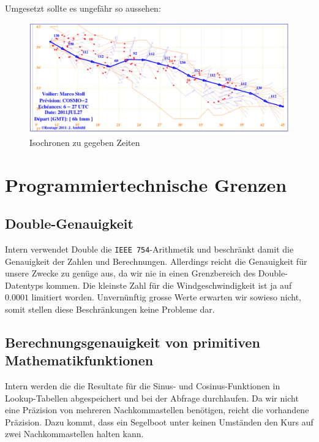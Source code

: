 Umgesetzt sollte es ungefähr so aussehen:

\begin{figure}[h!]
\centering
\includegraphics[width=1\linewidth]{img/isochronen}
\caption{Isochronen zu gegeben Zeiten}
\label{isochron}
\end{figure}

\section{Programmiertechnische Grenzen}
\subsection{Double-Genauigkeit}
Intern verwendet Double die \texttt{IEEE 754}-Arithmetik und beschränkt damit
die Genauigkeit der Zahlen und Berechnungen. Allerdings reicht die Genauigkeit
für unsere Zwecke zu genüge aus, da wir nie in einen Grenzbereich des
Double-Datentyps kommen. Die kleinste Zahl für die Windgeschwindigkeit ist ja
auf $0.0001$ limitiert worden. Unvernünftig grosse Werte erwarten wir sowieso
nicht, somit stellen diese Beschränkungen keine Probleme dar.

\subsection{Berechnungsgenauigkeit von primitiven Mathematikfunktionen}
Intern werden die die Resultate für die Sinus- und Cosinus-Funktionen in
Lookup-Tabellen abgespeichert und bei der Abfrage durchlaufen. Da wir nicht
eine Präzision von mehreren Nachkommastellen benötigen, reicht die vorhandene
Präzision. Dazu kommt, dass ein Segelboot unter keinen Umständen den Kurs auf
zwei Nachkommastellen halten kann.

